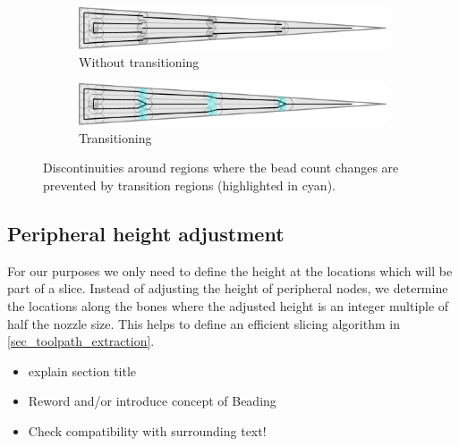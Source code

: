 \begin{figure}
\centering
\setlength{\figwidth}{\columnwidth}
\begin{subfigure}{0.9\figwidth}
\includegraphics[width=\columnwidth]{sources/method/wedge_distributed_generated__no_transitions.pdf}
\caption{Without transitioning}
\end{subfigure}
\begin{subfigure}{0.9\figwidth}
\includegraphics[width=\columnwidth]{sources/method/wedge_distributed_generated.pdf}
\caption{Transitioning}
\end{subfigure}
\caption{
Discontinuities around regions where the bead count changes are prevented by transition regions (highlighted in cyan).
}
\label{transitions}
\end{figure}














\subsection{Peripheral height adjustment}\label{sec_peripheral_height_adjustment}

For our purposes we only need to define the height at the locations which will be part of a slice.
Instead of adjusting the height of peripheral nodes, we determine the locations along the bones where the adjusted height is an integer multiple of half the nozzle size.
This helps to define an efficient slicing algorithm in \cref{sec_toolpath_extraction}.

\begin{itemize}
\item explain section title
\item Reword and/or introduce concept of Beading 
\item Check compatibility with surrounding text!
\end{itemize}


